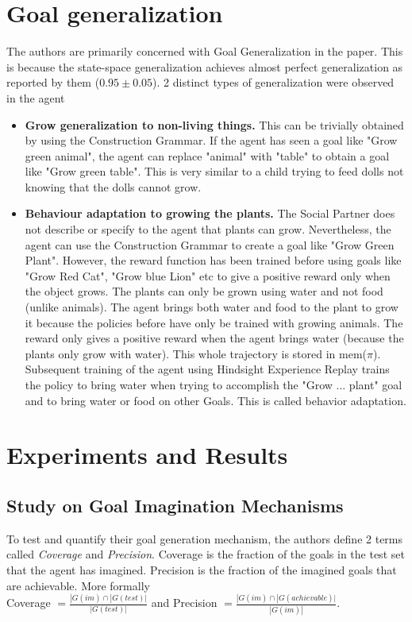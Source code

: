 \section{Goal generalization}
The authors are primarily concerned with Goal Generalization in the paper.  This is because the state-space generalization achieves almost perfect generalization as reported by them ($0.95 \pm 0.05$).  2 distinct types of generalization were observed in the agent
\begin{itemize}
\item \textbf{Grow generalization to non-living things.} This can be trivially obtained by using the Construction Grammar.  If the agent has seen a goal like "Grow green animal",  the agent can replace "animal" with "table" to obtain a goal like "Grow green table".  This is very similar to a child trying to feed dolls not knowing that the dolls cannot grow.
\item \textbf{Behaviour adaptation to growing the plants.} The Social Partner does not describe or specify to the agent that plants can grow.  Nevertheless, the agent can use the Construction Grammar to create a goal like "Grow Green Plant".  However,  the reward function has been trained before using goals like "Grow Red Cat",  "Grow blue Lion" etc to give a positive reward only when the object grows.  The plants can only be grown using water and not food (unlike animals).  The agent brings both water and food to the plant to grow it because the policies before have only be trained with growing animals.  The reward only gives a positive reward when the agent brings water (because the plants only grow with water).  This whole trajectory is stored in mem($\pi$).  Subsequent training of the agent using Hindsight Experience Replay trains the policy to bring water when trying to accomplish the "Grow ... plant" goal and to bring water or food on other Goals.  This is called behavior adaptation.
\end{itemize}

\section{Experiments and Results}

\subsection{Study on Goal Imagination Mechanisms}
To test and quantify their goal generation mechanism, the authors define 2 terms called \textit{Coverage} and \textit{Precision}.  Coverage is the fraction of the goals in the test set that the agent has imagined.  Precision is the fraction of the imagined goals that are achievable.  More formally \\
Coverage $ = \frac{|G(im) \cap |G(test)|}{ |G(test)| }  $ and Precision $ = \frac{|G(im) \cap |G(achievable)|}{ |G(im)| }$.

